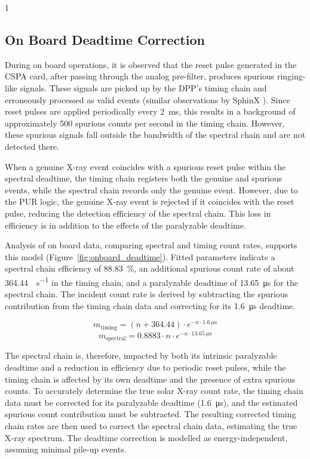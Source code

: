 \documentclass[12pt]{spieman}  %
\begin{document}
\begin{spacing}{1}
\subsection{On Board Deadtime Correction}
During on board operations, it is observed that the reset pulse generated in the CSPA card, after passing through the analog pre-filter, produces spurious ringing-like signals. These signals are picked up by the DPP's timing chain and erroneously processed as valid events (similar observations by SphinX \cite[Section 5]{Gburek2012}). Since reset pulses are applied periodically every \SI{2}{\milli\second}, this results in a background of approximately \num{500} spurious counts per second in the timing chain. However, these spurious signals fall outside the bandwidth of the spectral chain and are not detected there.

When a genuine X-ray event coincides with a spurious reset pulse within the spectral deadtime, the timing chain registers both the genuine and spurious events, while the spectral chain records only the genuine event. However, due to the PUR logic, the genuine X-ray event is rejected if it coincides with the reset pulse, reducing the detection efficiency of the spectral chain. This loss in efficiency is in addition to the effects of the paralyzable deadtime.

Analysis of on board data, comparing spectral and timing count rates, supports this model (Figure~\ref{fig:onboard_deadtime}). Fitted parameters indicate a spectral chain efficiency of \SI{88.83}{\percent}, an additional spurious count rate of about \SI{364.44}{\counts \per \second} in the timing chain, and a paralyzable deadtime of \SI{13.65}{\micro\second} for the spectral chain. The incident count rate is derived by subtracting the spurious contribution from the timing chain data and correcting for its \SI{1.6}{\micro\second} deadtime.

\begin{equation}
m_{\text{timing}} = (n + 364.44) \cdot e^{-n \cdot 1.6\,\mu\text{s}}    
\end{equation}
\begin{equation}
m_{\text{spectral}} = 0.8883 \cdot n \cdot e^{-n \cdot 13.65\,\mu\text{s}}    
\end{equation}

The spectral chain is, therefore, impacted by both its intrinsic paralyzable deadtime and a reduction in efficiency due to periodic reset pulses, while the timing chain is affected by its own deadtime and the presence of extra spurious counts. To accurately determine the true solar X-ray count rate, the timing chain data must be corrected for its paralyzable deadtime (\SI{1.6}{\micro\second}), and the estimated spurious count contribution must be subtracted. The resulting corrected timing chain rates are then used to correct the spectral chain data, estimating the true X-ray spectrum. The deadtime correction is modelled as energy-independent, assuming minimal pile-up events. 


\end{spacing}
\end{document}
